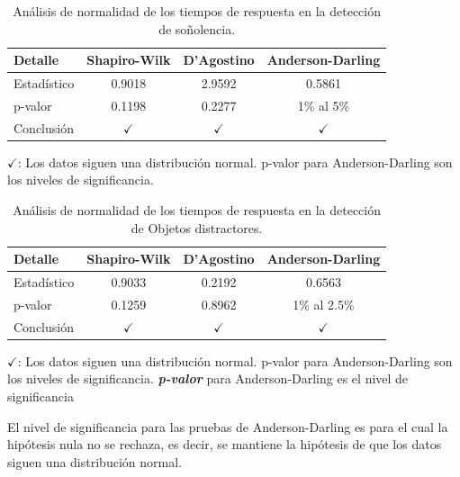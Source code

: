 				\begin{table}[h]
					\centering
					\caption{Análisis de normalidad de los tiempos de respuesta en la detección de soñolencia.}
					\label{SleepingNormality}
					\begin{tabularx}{0.6\textwidth}{Xccc}
						\toprule
						\textbf{Detalle} & \textbf{Shapiro-Wilk} & \textbf{D'Agostino} & \textbf{Anderson-Darling}\\
						\midrule
						Estadístico & 0.9018 & 2.9592 &  0.5861 \\
						p-valor & 0.1198 & 0.2277 & 1\% al 5\% \\
						Conclusión & \(\checkmark\) & \(\checkmark\) & \(\checkmark\)\\
					\end{tabularx}
					\vspace{0.3em} %
					\parbox{0.75\textwidth}{\footnotesize
						\(\checkmark\): Los datos siguen una distribución normal. p-valor para Anderson-Darling son los niveles de significancia.
					}
				\end{table}
				
				\begin{table}[h]
					\centering
					\caption{Análisis de normalidad de los tiempos de respuesta en la detección de Objetos distractores.}
					\label{ObjectNormality}
					\begin{tabularx}{0.6\textwidth}{Xccc}
						\toprule
						\textbf{Detalle} & \textbf{Shapiro-Wilk} & \textbf{D'Agostino} & \textbf{Anderson-Darling}\\
						\midrule
						Estadístico & 0.9033 & 0.2192 & 0.6563 \\
						p-valor & 0.1259 & 0.8962 & 1\% al 2.5\% \\
						Conclusión & \(\checkmark\) & \(\checkmark\) & \(\checkmark\)\\
					\end{tabularx}
					\vspace{0.3em} %
					\parbox{0.75\textwidth}{\footnotesize
						\(\checkmark\): Los datos siguen una distribución normal. p-valor para Anderson-Darling son los niveles de significancia. \textbf{\textit{p-valor}} para Anderson-Darling es el nivel de significancia
					}
				\end{table}
				
				El nivel de significancia para las pruebas de Anderson-Darling es para el cual la hipótesis nula no se rechaza, es decir, se mantiene la hipótesis de que los datos siguen una distribución normal.
				
